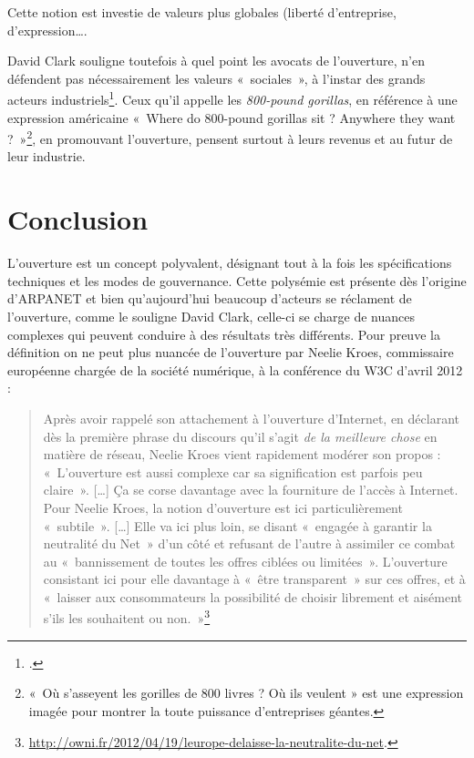\documentclass{FramateX}
\begin{document}
\begin{refsection}
Cette notion est investie de valeurs plus globales (liberté
d'entreprise, d'expression\ldots.

David Clark souligne toutefois à quel point les avocats de
l'ouverture, n'en défendent pas
nécessairement les valeurs «~sociales~», à l'instar
des grands acteurs industriels\footnote{\cite{clarknetwork2007}.}.
Ceux qu'il appelle les \textit{800-pound gorillas}, en
référence à une expression américaine «~Where do 800-pound gorillas sit
? Anywhere they want ?~»\footnote{«~Où s'asseyent
les gorilles de 800 livres ? Où ils veulent » est une expression imagée
pour montrer la toute puissance d'entreprises géantes.}, en promouvant l'ouverture, pensent surtout à leurs
revenus et au futur de leur industrie.

\section*{Conclusion}
{}

L'ouverture est un concept polyvalent, désignant tout à
la fois les spécifications techniques et les modes de gouvernance.
Cette polysémie est présente dès l'origine
d'ARPANET et bien
qu'aujourd'hui beaucoup
d'acteurs se réclament de
l'ouverture, comme le souligne David Clark, celle-ci
se charge de nuances complexes qui peuvent conduire à des résultats
très différents. Pour preuve la définition on ne peut plus nuancée de
l'ouverture par Neelie Kroes, commissaire européenne
chargée de la société numérique, à la conférence du W3C
d'avril 2012 : 

\begin{quote}

Après avoir rappelé son attachement à l'ouverture
d'Internet, en déclarant dès la première phrase du
discours qu'il s'agit \textit{de la
meilleure chose} en matière de réseau, Neelie Kroes vient rapidement
modérer son propos : «~L'ouverture est aussi complexe
car sa signification est parfois peu claire~». [\ldots] Ça se corse
davantage avec la fourniture de l'accès à Internet.
Pour Neelie Kroes, la notion d'ouverture est ici
particulièrement «~subtile~». [\ldots] Elle va ici plus loin, se disant
«~engagée à garantir la neutralité du Net~» d'un côté
et refusant de l'autre à assimiler ce combat au
«~bannissement de toutes les offres ciblées ou limitées~».
L'ouverture consistant ici pour elle davantage à
«~être transparent~» sur ces offres, et à «~laisser aux consommateurs
la possibilité de choisir librement et aisément s'ils
les souhaitent ou
non.~»\footnote{\url{http://owni.fr/2012/04/19/leurope-delaisse-la-neutralite-du-net}.}
\end{quote}


\end{refsection}
\end{document}
